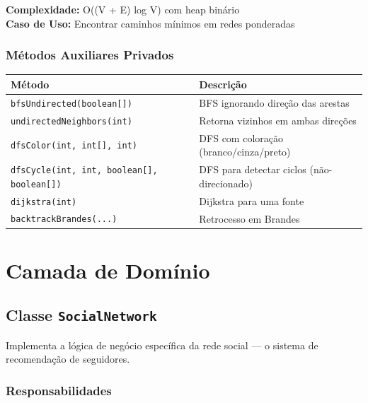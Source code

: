 \documentclass[12pt,a4paper]{article}
\begin{document}
\textbf{Complexidade:} O((V + E) log V) com heap binário \\
\textbf{Caso de Uso:} Encontrar caminhos mínimos em redes ponderadas

\subsubsection{Métodos Auxiliares Privados}

\begin{table}[h]
\centering
\begin{tabular}{|l|l|}
\hline
\textbf{Método} & \textbf{Descrição} \\
\hline
\texttt{bfsUndirected(boolean[])} & BFS ignorando direção das arestas \\
\hline
\texttt{undirectedNeighbors(int)} & Retorna vizinhos em ambas direções \\
\hline
\texttt{dfsColor(int, int[], int)} & DFS com coloração (branco/cinza/preto) \\
\hline
\texttt{dfsCycle(int, int, boolean[], boolean[])} & DFS para detectar ciclos (não-direcionado) \\
\hline
\texttt{dijkstra(int)} & Dijkstra para uma fonte \\
\hline
\texttt{backtrackBrandes(...)} & Retrocesso em Brandes \\
\hline
\end{tabular}
\end{table}

\newpage

\section{Camada de Domínio}

\subsection{Classe \texttt{SocialNetwork}}

Implementa a lógica de negócio específica da rede social — o sistema de recomendação de seguidores.

\subsubsection{Responsabilidades}
\end{document}
